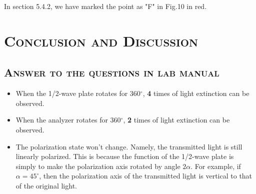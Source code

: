 \documentclass[a4paper,12pt]{article}
\begin{document}
\par In section 5.4.2, we have marked the point as "F" in Fig.10 in red.


\newpage
\section{\textsc{Conclusion and Discussion}}
\subsection{\textsc{Answer to the questions in lab manual}}
\begin{itemize}
\item When the 1/2-wave plate rotates for 360$^{\circ}$, \textbf{4} times of light extinction can be observed.
\item When the analyzer rotates for 360$^{\circ}$, \textbf{2} times of light extinction can be observed.
\item The polarization state won't change. Namely, the transmitted light is still linearly polarized. This is because the function of the 1/2-wave plate is simply to make the polarization axis rotated by angle $2\alpha$. For example, if $\alpha = 45^{\circ}$, then the polarization axis of the transmitted light is vertical to that of the original light.
\end{itemize}
\end{document}
